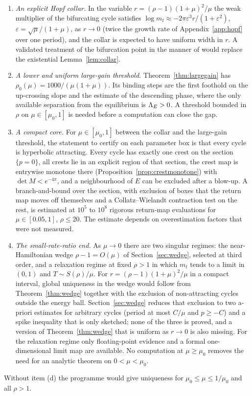 \begin{enumerate}[label=(\alph*)]
\item \emph{An explicit Hopf collar.} In the variable $r=(\rho-1)(1+\mu)^2/\mu$ the weak multiplier of the bifurcating cycle satisfies $\log m_t\approx-2\pi\varepsilon^3r/(1+\varepsilon^2)$, $\varepsilon=\sqrt\mu/(1+\mu)$, as $r\to0$ (twice the growth rate of Appendix~\ref{app:hopf} over one period), and the collar is expected to have uniform width in $r$. A validated treatment of the bifurcation point in the manner of \cite{vdBJ18} would replace the existential Lemma~\ref{lem:collar}.
\item \emph{A lower and uniform large-gain threshold.} Theorem~\ref{thm:largegain} has $\rho_0(\mu)=1000/(\mu(1+\mu))$. Its binding steps are the first foothold on the up-crossing slope and the estimate of the descending phase, where the only available separation from the equilibrium is $\Lambda_E>0$. A threshold bounded in $\rho$ on $\mu\in[\mu_0,1]$ is needed before a computation can close the gap.
\item \emph{A compact core.} For $\mu\in[\mu_0,1]$ between the collar and the large-gain threshold, the statement to certify on each parameter box is that every cycle is hyperbolic attracting. Every cycle has exactly one crest on the section $\{p=0\}$, all crests lie in an explicit region of that section, the crest map is entrywise monotone there (Proposition~\ref{prop:crestmonotone}) with $\det M<e^{-4\pi}$, and a neighbourhood of $E$ can be excluded after a blow-up. A branch-and-bound over the section, with exclusion of boxes that the return map moves off themselves and a Collatz--Wielandt contraction test on the rest, is estimated at $10^5$ to $10^8$ rigorous return-map evaluations for $\mu\in[0.05,1]$, $\rho\le20$. The estimate depends on overestimation factors that were not measured.
\item \emph{The small-rate-ratio end.} As $\mu\to0$ there are two singular regimes: the near-Hamiltonian wedge $\rho-1=O(\mu)$ of Section~\ref{sec:wedge}, selected at third order, and a relaxation regime at fixed $\rho>1$ in which $m_t$ tends to a limit in $(0,1)$ and $T\sim S(\rho)/\mu$. For $r=(\rho-1)(1+\mu)^2/\mu$ in a compact interval, global uniqueness in the wedge would follow from Theorem~\ref{thm:wedge} together with the exclusion of non-attracting cycles outside the energy ball. Section~\ref{sec:wedge} reduces that exclusion to two a-priori estimates for arbitrary cycles (period at most $C/\mu$ and $p\ge-C$) and a spike inequality that is only sketched; none of the three is proved, and a version of Theorem~\ref{thm:wedge} that is uniform as $r\to0$ is also missing. For the relaxation regime only floating-point evidence and a formal one-dimensional limit map are available. No computation at $\mu\ge\mu_0$ removes the need for an analytic theorem on $0<\mu<\mu_0$.
\end{enumerate}
Without item (d) the programme would give uniqueness for $\mu_0\le\mu\le1/\mu_0$ and all $\rho>1$.

